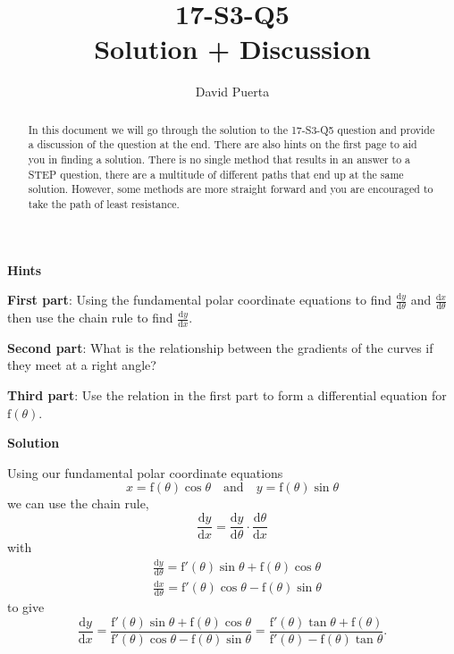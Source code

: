 \documentclass{article}
\title{17-S3-Q5 \\ Solution + Discussion}
\author{David Puerta}
\date{}
\newcommand{\der}[2]{\frac{\mathrm{d}#1}{\mathrm{d}#2}}
\begin{document}
\maketitle

\begin{abstract}
    \noindent In this document we will go through the solution to the 17-S3-Q5 question and provide a discussion of the question at the end. There are also hints on the first page to aid you in finding a solution. There is no single method that results in an answer to a STEP question, there are a multitude of different paths that end up at the same solution. However, some methods are more straight forward and you are encouraged to take the path of least resistance.  
\end{abstract}

\vspace{1cm}

\begin{center}
    \textbf{Hints}
\end{center}

\textbf{First part}: Using the fundamental polar coordinate equations to find $\der{y}{\theta}$ and $\der{x}{\theta}$ then use the chain rule to find $\der{y}{x}$.

\vspace{1cm}

\textbf{Second part}: What is the relationship between the gradients of the curves if they meet at a right angle?

\vspace{1cm}

\textbf{Third part}: Use the relation in the first part to form a differential equation for $\mathrm{f}(\theta)$.

\newpage

\begin{center}
    \textbf{Solution}
\end{center}

Using our fundamental polar coordinate equations
\[
x = \mathrm{f}(\theta) \cos \theta \quad \text{and} \quad y = \mathrm{f}(\theta) \sin \theta 
\]
we can use the chain rule,
\[
\der{y}{x} = \der{y}{\theta} \cdot \der{\theta}{x}
\]
with 
\begin{align*}
    & \der{y}{\theta} = \mathrm{f}'(\theta)\sin\theta + \mathrm{f}(\theta)\cos\theta \\
    & \der{x}{\theta} = \mathrm{f}'(\theta)\cos\theta - \mathrm{f}(\theta)\sin\theta
\end{align*}
to give 
\[
\der{y}{x} = \frac{\mathrm{f}'(\theta)\sin\theta + \mathrm{f}(\theta)\cos\theta}{\mathrm{f}'(\theta)\cos\theta - \mathrm{f}(\theta)\sin\theta} = \frac{\mathrm{f}'(\theta)\tan\theta + \mathrm{f}(\theta)}{\mathrm{f}'(\theta)-\mathrm{f}(\theta)\tan\theta}.
\]
\end{document}
